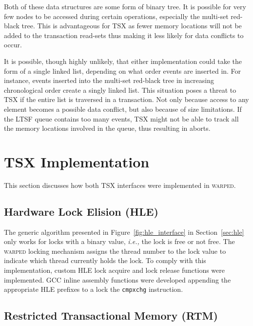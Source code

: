 \documentclass[11pt]{book}
\begin{document}
Both of these data structures are some form of binary tree.  It is possible for very few
nodes to be accessed during certain operations, especially the multi-set red-black tree.
This is advantageous for TSX as fewer memory locations will not be added to the
transaction read-sets thus making it less likely for data conflicts to occur.

It is possible, though highly unlikely, that either implementation could take the form of
a single linked list, depending on what order events are inserted in.  For instance,
events inserted into the multi-set red-black tree in increasing chronological order create
a singly linked list.  This situation poses a threat to TSX if the entire list is
traversed in a transaction.  Not only because access to any element becomes a possible
data conflict, but also because of size limitations.  If the LTSF queue contains too many
events, TSX might not be able to track all the memory locations involved in the queue,
thus resulting in aborts.

\section{TSX Implementation}

This section discusses how both TSX interfaces were implemented in \textsc{warped}.

\subsection{Hardware Lock Elision (HLE)}

The generic algorithm presented in Figure~\ref{fig:hle_interface} in Section~\ref{sec:hle}
only works for locks with a binary value, \emph{i.e.,} the lock is free or not free.  The
\textsc{warped} locking mechanism assigns the thread number to the lock value to indicate
which thread currently holds the lock.  To comply with this implementation, custom HLE
lock acquire and lock release functions were implemented.  GCC inline assembly functions
were developed appending the appropriate HLE prefixes to a lock the \texttt{cmpxchg}
instruction. 

\subsection{Restricted Transactional Memory (RTM)}
\end{document}
